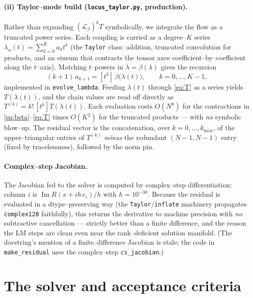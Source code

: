 \documentclass[11pt]{article}
\newcommand{\Lie}{\mathcal{L}}
\newcommand{\code}[1]{\texttt{#1}}
\begin{document}
\paragraph{(ii) Taylor--mode build (\code{locus\_taylor.py}, production).}
Rather than expanding $(\Lie_\beta)^k T$ symbolically, we integrate the flow as
a truncated power series. Each coupling is carried as a degree--$K$ series
$\lambda_\alpha(t)=\sum_{k=0}^{K}a_k t^k$ (the \code{Taylor} class: addition,
truncated convolution for products, and an einsum that contracts the tensor
axes coefficient--by--coefficient along the $t$--axis). Matching $t$--powers in
$\dot\lambda=\beta(\lambda)$ gives the recursion
\begin{equation}
(k+1)\,a_{k+1}=[t^k]\,\beta\bigl(\lambda(t)\bigr),\qquad k=0,\dots,K-1,
\end{equation}
implemented in \code{evolve\_lambda}. Feeding $\lambda(t)$ through
\eqref{eq:T} as a series yields $T(\lambda(t))$, and the chain values are read
off directly as $T^{(k)}=k!\,[t^k]T(\lambda(t))$. Each evaluation costs
$O(N^8)$ for the contractions in \eqref{eq:beta}--\eqref{eq:T} times $O(K^2)$
for the truncated products --- with \emph{no} symbolic blow--up. The residual
vector is the concatenation, over $k=0,\dots,k_{\max}$, of the upper--triangular
entries of $T^{(k)}$ \emph{minus} the redundant $(N\!-\!1,N\!-\!1)$ entry (fixed
by tracelessness), followed by the norm pin.

\paragraph{Complex--step Jacobian.}
The Jacobian fed to the solver is computed by complex--step differentiation:
column $i$ is $\operatorname{Im} R(x+i h\,e_i)/h$ with $h=10^{-30}$. Because the
residual is evaluated in a dtype--preserving way (the \code{Taylor}/\code{inflate}
machinery propagates \code{complex128} faithfully), this returns the derivative
to machine precision with \emph{no} subtractive cancellation --- strictly
better than a finite difference, and the reason the LM steps are clean even
near the rank--deficient solution manifold. (The docstring's mention of a
finite--difference Jacobian is stale; the code in \code{make\_residual} uses the
complex--step \code{cs\_jacobian}.)

\section{The solver and acceptance criteria}
\label{sec:solver}
\end{document}
